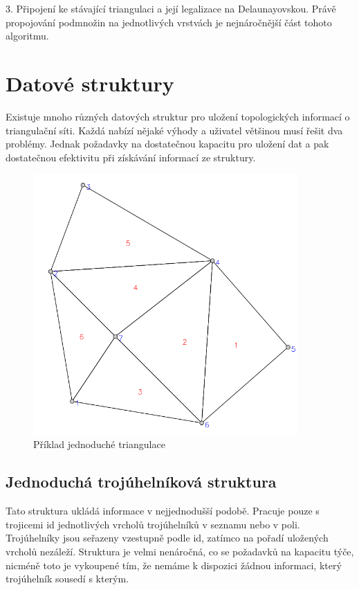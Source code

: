 \documentclass[12pt,a4paper]{article}
\begin{document}
3. Připojení ke stávající triangulaci a její legalizace na Delaunayovskou. Právě propojování podmnožin na jednotlivých vrstvách je nejnáročnější část tohoto algoritmu.

\newpage
\section{Datové struktury}\label{sec:data_struct}

Existuje mnoho různých datových struktur pro uložení topologických informací o triangulační síti. Každá nabízí nějaké výhody a uživatel většinou musí řešit dva problémy. Jednak požadavky na dostatečnou kapacitu pro uložení dat a pak dostatečnou efektivitu při získávání informací ze struktury.

\begin{figure}[h!]
\centering
\includegraphics[width=0.9\textwidth]{img/struct_triangulace.png}
\caption{Příklad jednoduché triangulace}
\label{fig:struct_triangulace}
\end{figure}

\newpage
\subsection{Jednoduchá trojúhelníková struktura}
Tato struktura ukládá informace v nejjednodušší podobě. Pracuje pouze s trojicemi id jednotlivých vrcholů trojúhelníků v seznamu nebo v poli. Trojúhelníky jsou seřazeny vzestupně podle id, zatímco na pořadí uložených vrcholů nezáleží. Struktura je velmi nenáročná, co se požadavků na kapacitu týče, nicméně toto je vykoupené tím, že nemáme k dispozici žádnou informaci, který trojúhelník sousedí s kterým.
\end{document}
